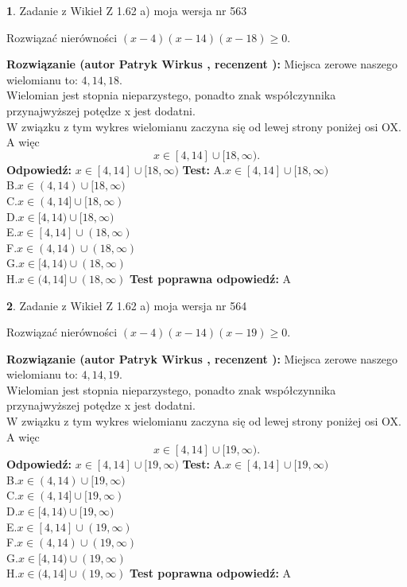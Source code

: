 \documentclass[12pt, a4paper]{article}
\theoremstyle{definition} %
\newtheorem{zad}{}
\newcommand{\zadStart}[1]{\begin{zad}#1\newline}
\newcommand{\zadStop}{\end{zad}}
\newcommand{\rozwStart}[2]{\noindent \textbf{Rozwiązanie (autor #1 , recenzent #2): }\newline}
\newcommand{\rozwStop}{\newline}
\newcommand{\odpStart}{\noindent \textbf{Odpowiedź:}\newline}
\newcommand{\odpStop}{\newline}
\newcommand{\testStart}{\noindent \textbf{Test:}\newline}
\newcommand{\testStop}{\newline}
\newcommand{\kluczStart}{\noindent \textbf{Test poprawna odpowiedź:}\newline}
\newcommand{\kluczStop}{\newline}
\begin{document}
\zadStart{Zadanie z Wikieł Z 1.62 a) moja wersja nr 563}

Rozwiązać nierówności $(x-4)(x-14)(x-18)\ge0$.
\zadStop
\rozwStart{Patryk Wirkus}{}
Miejsca zerowe naszego wielomianu to: $4, 14, 18$.\\
Wielomian jest stopnia nieparzystego, ponadto znak współczynnika przy\linebreak najwyższej potędze x jest dodatni.\\ W związku z tym wykres wielomianu zaczyna się od lewej strony poniżej osi OX. A więc $$x \in [4,14] \cup [18,\infty).$$
\rozwStop
\odpStart
$x \in [4,14] \cup [18,\infty)$
\odpStop
\testStart
A.$x \in [4,14] \cup [18,\infty)$\\
B.$x \in (4,14) \cup [18,\infty)$\\
C.$x \in (4,14] \cup [18,\infty)$\\
D.$x \in [4,14) \cup [18,\infty)$\\
E.$x \in [4,14] \cup (18,\infty)$\\
F.$x \in (4,14) \cup (18,\infty)$\\
G.$x \in [4,14) \cup (18,\infty)$\\
H.$x \in (4,14] \cup (18,\infty)$
\testStop
\kluczStart
A
\kluczStop



\zadStart{Zadanie z Wikieł Z 1.62 a) moja wersja nr 564}

Rozwiązać nierówności $(x-4)(x-14)(x-19)\ge0$.
\zadStop
\rozwStart{Patryk Wirkus}{}
Miejsca zerowe naszego wielomianu to: $4, 14, 19$.\\
Wielomian jest stopnia nieparzystego, ponadto znak współczynnika przy\linebreak najwyższej potędze x jest dodatni.\\ W związku z tym wykres wielomianu zaczyna się od lewej strony poniżej osi OX. A więc $$x \in [4,14] \cup [19,\infty).$$
\rozwStop
\odpStart
$x \in [4,14] \cup [19,\infty)$
\odpStop
\testStart
A.$x \in [4,14] \cup [19,\infty)$\\
B.$x \in (4,14) \cup [19,\infty)$\\
C.$x \in (4,14] \cup [19,\infty)$\\
D.$x \in [4,14) \cup [19,\infty)$\\
E.$x \in [4,14] \cup (19,\infty)$\\
F.$x \in (4,14) \cup (19,\infty)$\\
G.$x \in [4,14) \cup (19,\infty)$\\
H.$x \in (4,14] \cup (19,\infty)$
\testStop
\kluczStart
A
\kluczStop
\end{document}

